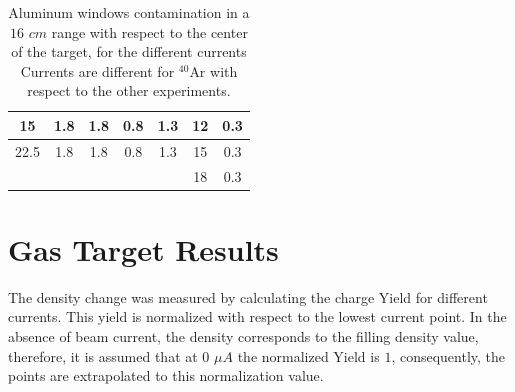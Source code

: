 \documentclass[final,5p,times,twocolumn,balance]{elsarticle}
\begin{document}
\begin{table}[h!]
\begin{tabular}{|c|c|c|c|c|c|c|}
15                                                               & 1.8                                                             & 1.8                                                              & 0.8                                                             & 1.3                                                             & 12                                                              & 0.3                                                                                \\ \hline
22.5                                                             & 1.8                                                             & 1.8                                                              & 0.8                                                             & 1.3                                                             & 15                                                              & 0.3                                                                                \\ \hline
\multicolumn{5}{|l|}{}                                                                                                                                                                                                                                                                                                                    & 18                                                              & 0.3                                                                                \\ \hline
\end{tabular}
\caption{Aluminum windows contamination in a $16$ $cm$ range with respect to the center of the target, for the different currents Currents are different for $^{40}$Ar with respect to the other experiments.}
\label{tab:contamination_al}
\end{table}

 
\section{Gas Target Results}

The density change was measured by calculating the charge Yield for different currents. This yield is normalized with respect to the lowest current point. In the absence of beam current, the density corresponds to the filling density value, therefore, it is assumed that at $0$ $\mu A$ the normalized Yield is $1$, consequently, the points are extrapolated to this normalization value. 
\end{document}
